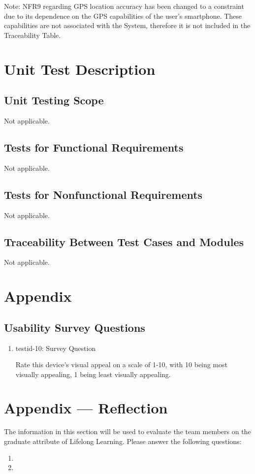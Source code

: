 \documentclass[12pt, titlepage]{article}
\begin{document}
Note: NFR9 regarding GPS location accuracy has been changed to a constraint due to its dependence on the GPS capabilities of the user's smartphone. These capabilities are not associated with the System, therefore it is not included in the Traceability Table.

\section{Unit Test Description}
\label{Section 6}

\subsection{Unit Testing Scope}

Not applicable.

\subsection{Tests for Functional Requirements}

Not applicable.

\subsection{Tests for Nonfunctional Requirements}

Not applicable.

\subsection{Traceability Between Test Cases and Modules}

Not applicable.
				




\newpage

\section{Appendix}

\subsection{Usability Survey Questions}

\begin{enumerate}

\item{testid-10: Survey Question}
\label{Survey}

Rate this device's visual appeal on a scale of 1-10, with 10 being most visually appealing, 1 being least visually appealing.

\end{enumerate}


\newpage{}
\section*{Appendix --- Reflection}

The information in this section will be used to evaluate the team members on the
graduate attribute of Lifelong Learning.  Please answer the following questions:

\begin{enumerate}
  \item 
  \item 
\end{enumerate}
\end{document}
